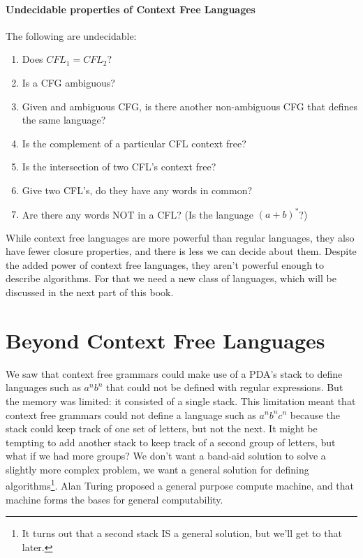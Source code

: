 \documentclass[letterpaper,12pt,openany,reqno]{book}%
\begin{document}
\subsection {Undecidable properties of Context Free Languages}
The following are undecidable:
\begin{enumerate}
\item Does $CFL_1 = CFL_2$?
\item Is a CFG ambiguous?
\item Given and ambiguous CFG, is there another non-ambiguous CFG that defines the same language?
\item Is the complement of a particular CFL context free?
\item Is the intersection of two CFL's context free?
\item Give two CFL's, do they have any words in common?
\item Are there any words NOT in a CFL? (Is the language $(a+b)^*$?)
\end{enumerate}

While context free languages are more powerful than regular languages, they also have fewer closure properties, and there is less we can decide about them. Despite the added power of context free languages, they aren't powerful enough to describe algorithms. For that we need a new class of languages, which will be discussed in the next part of this book.

\part{Beyond Context Free Languages}
\label{C.Beyond.Context.Free}
We saw that context free grammars could make use of a PDA's stack to define languages such as $a^nb^n$ that could not be defined with regular expressions. But the memory was limited: it consisted of a single stack. This limitation meant that context free grammars could not define a language such as $a^nb^nc^n$ because the stack could keep track of one set of letters, but not the next. It might be tempting to add another stack to keep track of a second group of letters, but what if we had more groups? We don't want a band-aid solution to solve a slightly more complex problem, we want a general solution for defining algorithms\footnote{It turns out that a second stack IS a general solution, but we'll get to that later.}. Alan Turing proposed a general purpose compute machine, and that machine forms the bases for general computability.
\end{document}
